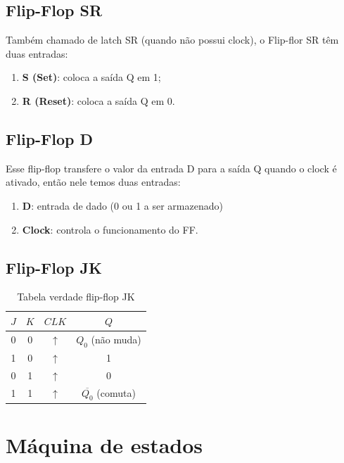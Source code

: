 \documentclass[12pt]{article}
\begin{document}
\subsection{Flip-Flop SR}

Também chamado de latch SR (quando não possui clock), o Flip-flor SR têm duas entradas:
\begin{enumerate}
    \item \textbf{S (Set)}: coloca a saída Q em 1;
    \item \textbf{R (Reset)}: coloca a saída Q em 0.
\end{enumerate}

\subsection{Flip-Flop D}
Esse flip-flop transfere o valor da entrada D para a saída Q quando o clock é ativado, então nele temos duas entradas:
\begin{enumerate}
    \item \textbf{D}: entrada de dado (0 ou 1 a ser armazenado)
    \item \textbf{Clock}: controla o funcionamento do FF.
\end{enumerate}

\subsection{Flip-Flop JK}
\begin{table}[h]
\centering

{\large
\begin{tabular}{|c|c|c|c|}
\hline
$J$ & $K$ & $CLK$ & $Q$ \\ \hline
0 & 0 & $\uparrow$ & $Q_0$ (não muda) \\ \hline
1 & 0 & $\uparrow$ & 1 \\ \hline
0 & 1 & $\uparrow$ & 0 \\ \hline
1 & 1 & $\uparrow$ & $\overline{Q_0}$ (comuta) \\ \hline
\end{tabular}
}

\caption{Tabela verdade flip-flop JK}
\label{tabela:jk}
\end{table}

\section{Máquina de estados}
\end{document}
